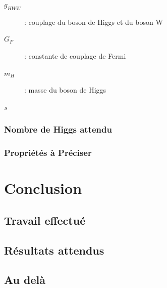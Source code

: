 \documentclass[10pt,a4paper]{report}
\begin{document}
\begin{description}

	\item[$g_{HWW}$] : couplage du boson de Higgs et du boson W

	\item[$G_F$] : constante de couplage de Fermi
	
	\item[$m_H$] : masse du boson de Higgs
	
	\item[$s$]
		
\end{description}

\subsection{Nombre de Higgs attendu}

\subsection{Propriétés à Préciser}

\chapter{Conclusion}

\section{Travail effectué}

\section{Résultats attendus}

\section{Au delà}

\end{document}

